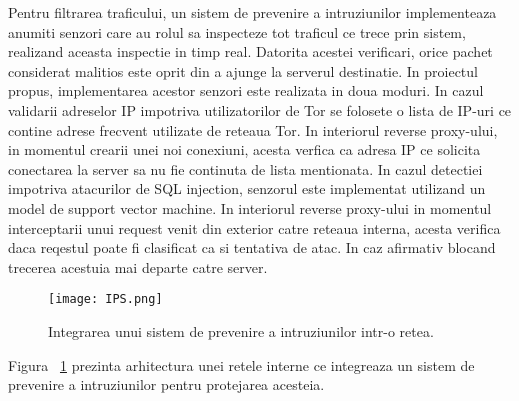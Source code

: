 Pentru filtrarea traficului, un sistem de prevenire a intruziunilor implementeaza anumiti senzori care au rolul sa inspecteze tot traficul ce trece prin sistem, realizand aceasta inspectie in timp real. Datorita acestei verificari, orice pachet considerat malitios este oprit din a ajunge la serverul destinatie. In proiectul propus, implementarea acestor senzori este realizata in doua moduri. In cazul validarii adreselor IP impotriva utilizatorilor de Tor se folosete o lista de IP-uri ce contine adrese frecvent utilizate de reteaua Tor. In interiorul reverse proxy-ului, in momentul crearii unei noi conexiuni, acesta verfica ca adresa IP ce solicita conectarea la server sa nu fie continuta de lista mentionata. In cazul detectiei impotriva atacurilor de SQL injection, senzorul este implementat utilizand un model de support vector machine. In interiorul reverse proxy-ului in momentul interceptarii unui request venit din exterior catre reteaua interna, acesta verifica daca reqestul poate fi clasificat ca si tentativa de atac. In caz afirmativ blocand trecerea acestuia mai departe catre server.
\begin{figure}[h]
	\centering
	\texttt{[image: IPS.png]}
	\caption{Integrarea unui sistem de prevenire a intruziunilor intr-o retea.}
	\label{fig:ips-2nd-example}
\end{figure}

Figura ~\ref{fig:ips-2nd-example} prezinta arhitectura unei retele interne ce integreaza un sistem de prevenire a intruziunilor pentru protejarea acesteia. \\

